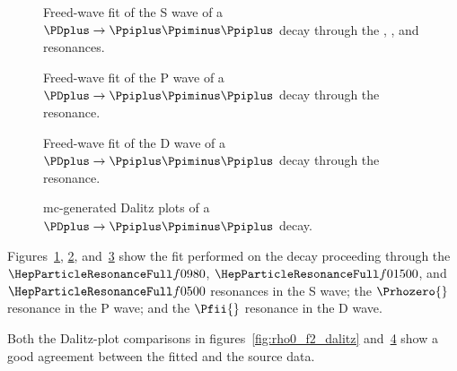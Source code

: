     \begin{figure}
        \centering
        \subfloat[][]{}

        \subfloat[][]{}

        \caption{Freed-wave fit of the S wave of a $\PDplus \to \Ppiplus\Ppiminus\Ppiplus$ decay through the \Pfnez{}, \Pfofzz, and \Psigma{} resonances.~\Star}
        \label{fig:f0_f0_1500_sigma_rho0_f2:s_wave}
    \end{figure}
    \begin{figure}
        \centering
        \subfloat[][]{}

        \subfloat[][]{}

        \caption{Freed-wave fit of the P wave of a $\PDplus \to \Ppiplus\Ppiminus\Ppiplus$ decay through the \Prhozero{} resonance.~\Star}
        \label{fig:f0_f0_1500_sigma_rho0_f2:p_wave}
    \end{figure}
    \begin{figure}
        \centering
        \subfloat[][]{}

        \subfloat[][]{}

        \caption{Freed-wave fit of the D wave of a $\PDplus \to \Ppiplus\Ppiminus\Ppiplus$ decay through the \Pfii{} resonance.~\Star}
        \label{fig:f0_f0_1500_sigma_rho0_f2:d_wave}
    \end{figure}
    \begin{figure}
        \centering

        \caption{\ac{mc}-generated Dalitz plots of a $\PDplus \to \Ppiplus\Ppiminus\Ppiplus$ decay.~\Star}
        \label{fig:f0_f0_1500_sigma_rho0_f2_dalitz}
    \end{figure}
    Figures~\ref{fig:f0_f0_1500_sigma_rho0_f2:s_wave}, \ref{fig:f0_f0_1500_sigma_rho0_f2:p_wave}, and~\ref{fig:f0_f0_1500_sigma_rho0_f2:d_wave} show the fit performed on the decay proceeding through the $\Pfnez{}$, $\Pfofzz{}$, and $\Psigma{}$ resonances in the S wave; the $\Prhozero{}$ resonance in the P wave; and the $\Pfii{}$ resonance in the D wave.

    Both the Dalitz-plot comparisons in figures~\ref{fig:rho0_f2_dalitz} and~\ref{fig:f0_f0_1500_sigma_rho0_f2_dalitz} show a good agreement between the fitted and the source data.
